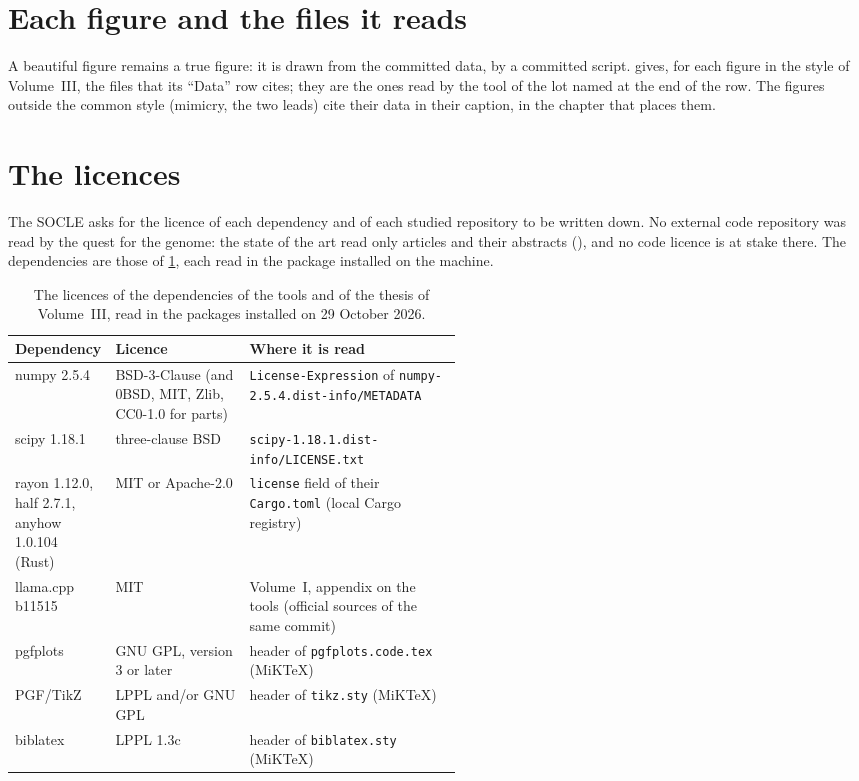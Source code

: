 

\section{Each figure and the files it reads}\label{t3ann:sec:figures}

A beautiful figure remains a true figure: it is drawn from the committed data, by a committed script.  gives, for each figure in the style of Volume~III, the files that its ``Data'' row cites; they are the ones read by the tool of the lot named at the end of the row. The figures outside the common style (mimicry, the two leads) cite their data in their caption, in the chapter that places them.



\section{The licences}\label{t3ann:sec:licences}

The SOCLE asks for the licence of each dependency and of each studied repository to be written down. No external code repository was read by the quest for the genome: the state of the art read only articles and their abstracts (), and no code licence is at stake there. The dependencies are those of \cref{t3ann:tab:licences}, each read in the package installed on the machine.

\begin{table}[ht]
\centering\footnotesize
\caption[The licences of the dependencies of Volume~III]{The licences of the dependencies of the tools and of the thesis of Volume~III, read in the packages installed on 29 October 2026.}
\label{t3ann:tab:licences}
\begin{tabularx}{\linewidth}{@{}>{\raggedright\arraybackslash}p{0.22\linewidth}>{\raggedright\arraybackslash}p{0.30\linewidth}>{\raggedright\arraybackslash}X@{}}
\toprule
Dependency & Licence & Where it is read \\
\midrule
numpy 2.5.4 & BSD-3-Clause (and 0BSD, MIT, Zlib, CC0-1.0 for parts) & \texttt{License-Expression} of \texttt{numpy-2.5.4.dist-info/METADATA} \\
scipy 1.18.1 & three-clause BSD & \texttt{scipy-1.18.1.dist-info/LICENSE.txt} \\
rayon 1.12.0, half 2.7.1, anyhow 1.0.104 (Rust) & MIT or Apache-2.0 & \texttt{license} field of their \texttt{Cargo.toml} (local Cargo registry) \\
llama.cpp b11515 & MIT & Volume~I, appendix on the tools (official sources of the same commit) \\
pgfplots & GNU GPL, version 3 or later & header of \texttt{pgfplots.code.tex} (MiKTeX) \\
PGF/TikZ & LPPL and/or GNU GPL & header of \texttt{tikz.sty} (MiKTeX) \\
biblatex & LPPL 1.3c & header of \texttt{biblatex.sty} (MiKTeX) \\
\bottomrule
\end{tabularx}
\end{table}

